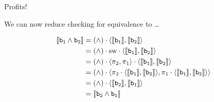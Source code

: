 \documentclass{beamer}
\begin{document}
\begin{frame}{Profits!}
        
        We can now reduce checking for equivalence to \dots
        \begin{center}
        \end{center}
        
        \pause
        \begin{example}
        \small{
        \begin{align*}
                \llbracket \mathtt{b_1} \wedge \mathtt{b_2} \rrbracket & =
                (\wedge) \cdot \langle \llbracket \mathtt{b_1} \rrbracket, \llbracket \mathtt{b_2} \rrbracket \rangle
                \\
                                                   & = (\wedge) \cdot \mathrm{sw}
                                                   \cdot 
                                                   \langle \llbracket \mathtt{b_1} \rrbracket, \llbracket \mathtt{b_2} \rrbracket \rangle
                                                   \\
                                                   & = (\wedge) \cdot \langle \pi_2, \pi_1 \rangle
                                                   \cdot 
                                                   \langle \llbracket \mathtt{b_1} \rrbracket, \llbracket \mathtt{b_2} \rrbracket \rangle
                                                   \\
                                                   & = (\wedge) \cdot \langle \pi_2
                                                   \cdot \langle \llbracket \mathtt{b_1} \rrbracket, 
                                                   \llbracket \mathtt{b_2} \rrbracket \rangle, \pi_1
                                                   \cdot \langle \llbracket \mathtt{b_1} \rrbracket, \llbracket \mathtt{b_2} \rrbracket \rangle \rangle
                                                   \\
                                                   & = (\wedge) \cdot 
                                                   \langle \llbracket \mathtt{b_2} \rrbracket, \llbracket \mathtt{b_1} \rrbracket \rangle
                                                   \\
                                                   & = \llbracket \mathtt{b_2} \wedge \mathtt{b_1} \rrbracket
         \end{align*}
        }
        \end{example}
\end{frame}
\end{document}
